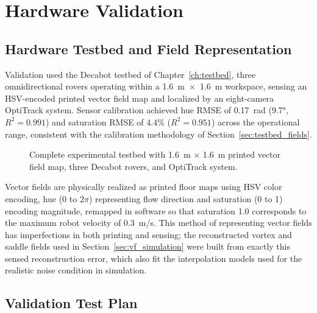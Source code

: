 \documentclass[12pt, letterpaper, oneside]{report}
\begin{document}
\section{Hardware Validation}
\label{sec:vf_hardware}

\subsection{Hardware Testbed and Field Representation}

Validation used the Decabot testbed of Chapter~\ref{ch:testbed}, three
omnidirectional rovers operating within a 1.6~m~$\times$~1.6~m workspace,
sensing an HSV-encoded printed vector field map and localized by an
eight-camera OptiTrack system. Sensor calibration achieved hue RMSE of
0.17~rad (9.7°, $R^2=0.991$) and saturation RMSE of 4.4\% ($R^2=0.951$)
across the operational range, consistent with the calibration methodology
of Section~\ref{sec:testbed_fields}.
\begin{figure}[!t]
\centering
\framebox[0.9\linewidth]{\rule{0pt}{3.0cm}}
\caption{Complete experimental testbed with 1.6~m $\times$ 1.6~m printed
vector field map, three Decabot rovers, and OptiTrack system.}
\label{fig:fullbed}
\end{figure}

Vector fields are physically realized as printed floor maps using HSV color
encoding, hue (0 to $2\pi$) representing flow direction and saturation
(0 to 1) encoding magnitude, remapped in software so that saturation 1.0
corresponds to the maximum robot velocity of 0.3~m/s. This method of
representing vector fields has imperfections in both printing and sensing;
the reconstructed vortex and saddle fields used in
Section~\ref{sec:vf_simulation} were built from exactly this sensed
reconstruction error, which also fit the interpolation models used for the
realistic noise condition in simulation.

\subsection{Validation Test Plan}
\end{document}

